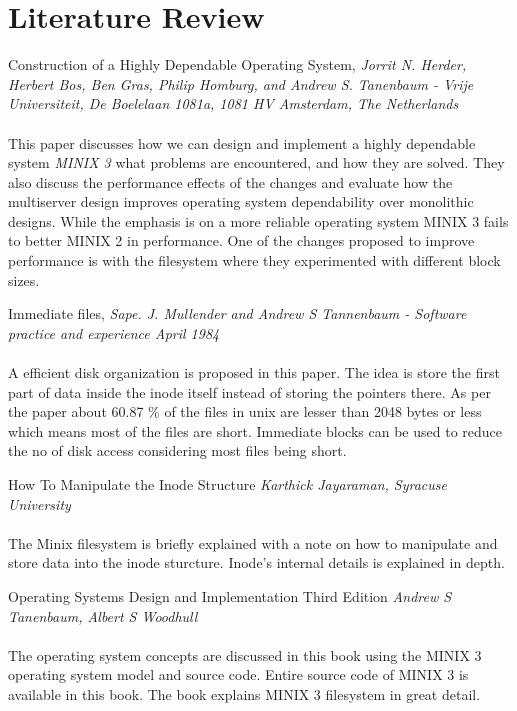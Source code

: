 \chapter{Literature Review}

\vspace{10mm}
 Construction of a Highly Dependable Operating System, { \em Jorrit N. Herder, Herbert Bos, Ben Gras, Philip Homburg, and Andrew S. Tanenbaum - Vrije Universiteit, De Boelelaan 1081a, 1081 HV Amsterdam, The Netherlands
}\cite{chdos}
\\
\\
This paper discusses how we can design and implement a highly dependable system { \em MINIX 3} what problems are encountered, and how they are solved. They also discuss the performance effects of the changes and evaluate how the multiserver design improves operating system dependability over monolithic designs. While the emphasis is on a more reliable operating system MINIX 3 fails to better MINIX 2 in performance. One of the changes proposed to improve performance is with the filesystem where they experimented with different block sizes.

\vspace{10mm}

Immediate files, { \em  Sape. J. Mullender and Andrew S Tannenbaum - Software practice and experience April 1984 }\cite{astimme}
\\
\\
A efficient disk organization is proposed in this paper. The idea is store the first part of data inside the inode itself instead of storing the pointers there. As per the paper about 60.87 \% of the files in unix are lesser than 2048 bytes or less which means most of the files are short. Immediate blocks can be used to reduce the no of disk access considering most files being short.


How To Manipulate the Inode Structure  { \em Karthick Jayaraman, Syracuse University } \cite{inode}
\\ 
\\
The Minix filesystem is briefly explained with a note on how to manipulate and store data into the inode sturcture. Inode's internal details is explained in depth.

\vspace{10mm}

Operating Systems Design and Implementation Third Edition { \em Andrew S Tanenbaum, Albert S Woodhull }\cite{ast}
\\
\\
The operating system concepts are discussed in this book using the MINIX 3 operating system model and source code. Entire source code of MINIX 3 is available in this book. The book explains MINIX 3 filesystem in great detail. 

